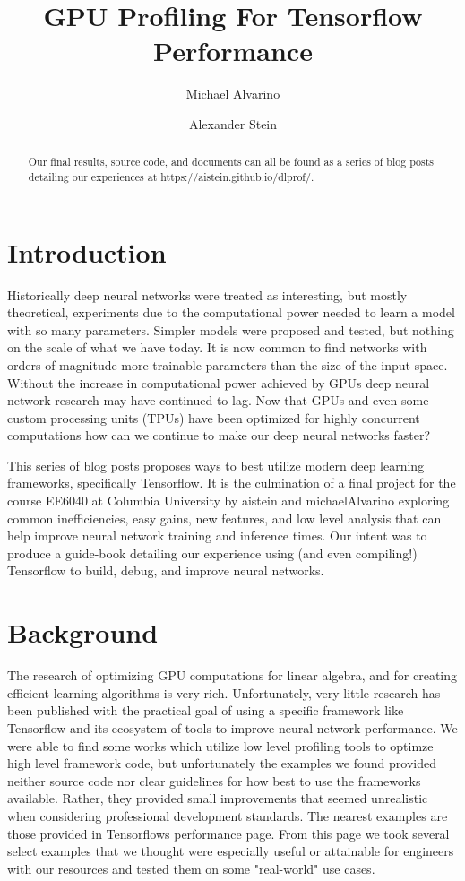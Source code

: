 \documentclass{article}
\title{GPU Profiling For Tensorflow Performance}
\author{Michael Alvarino}
\author{Alexander Stein}
\begin{document}
\maketitle

\begin{abstract}
Our final results, source code, and documents can all be found as a series of blog posts detailing our experiences at https://aistein.github.io/dlprof/.
\end{abstract}

\section{Introduction}
Historically deep neural networks were treated as interesting, but mostly theoretical, experiments due to the computational power needed to learn a model with so many parameters. Simpler models were proposed and tested, but nothing on the scale of what we have today. It is now common to find networks with orders of magnitude more trainable parameters than the size of the input space. Without the increase in computational power achieved by GPUs deep neural network research may have continued to lag. Now that GPUs and even some custom processing units (TPUs) have been optimized for highly concurrent computations how can we continue to make our deep neural networks faster?

This series of blog posts proposes ways to best utilize modern deep learning frameworks, specifically Tensorflow. It is the culmination of a final project for the course EE6040 at Columbia University by aistein and michaelAlvarino exploring common inefficiencies, easy gains, new features, and low level analysis that can help improve neural network training and inference times. Our intent was to produce a guide-book detailing our experience using (and even compiling!) Tensorflow to build, debug, and improve neural networks.

\section{Background}
The research of optimizing GPU computations for linear algebra, and for creating efficient learning algorithms is very rich. Unfortunately, very little research has been published with the practical goal of using a specific framework like Tensorflow and its ecosystem of tools to improve neural network performance. We were able to find some works which utilize low level profiling tools to optimze high level framework code, but unfortunately the examples we found provided neither source code nor clear guidelines for how best to use the frameworks available. Rather, they provided small improvements that seemed unrealistic when considering professional development standards. The nearest examples are those provided in Tensorflows performance page. From this page we took several select examples that we thought were especially useful or attainable for engineers with our resources and tested them on some "real-world" use cases.
\end{document}
